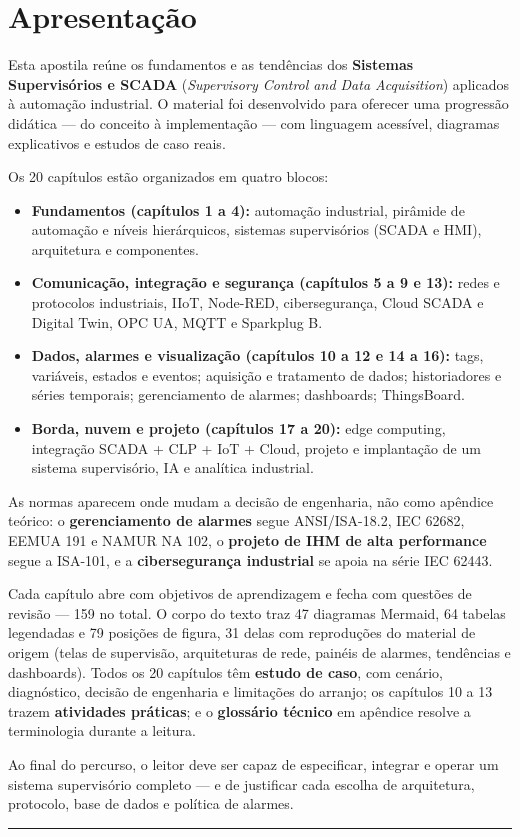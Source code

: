 \chapter*{Apresentação}
Esta apostila reúne os fundamentos e as tendências dos \textbf{Sistemas Supervisórios e SCADA} (\emph{Supervisory Control and Data Acquisition}) aplicados à automação industrial. O material foi desenvolvido para oferecer uma progressão didática --- do conceito à implementação --- com linguagem acessível, diagramas explicativos e estudos de caso reais.

Os 20 capítulos estão organizados em quatro blocos:

\begin{itemize}
\tightlist
\item
  \textbf{Fundamentos (capítulos 1 a 4):} automação industrial, pirâmide de automação e níveis hierárquicos, sistemas supervisórios (SCADA e HMI), arquitetura e componentes.
\item
  \textbf{Comunicação, integração e segurança (capítulos 5 a 9 e 13):} redes e protocolos industriais, IIoT, Node-RED, cibersegurança, Cloud SCADA e Digital Twin, OPC UA, MQTT e Sparkplug B.
\item
  \textbf{Dados, alarmes e visualização (capítulos 10 a 12 e 14 a 16):} tags, variáveis, estados e eventos; aquisição e tratamento de dados; historiadores e séries temporais; gerenciamento de alarmes; dashboards; ThingsBoard.
\item
  \textbf{Borda, nuvem e projeto (capítulos 17 a 20):} edge computing, integração SCADA + CLP + IoT + Cloud, projeto e implantação de um sistema supervisório, IA e analítica industrial.
\end{itemize}

As normas aparecem onde mudam a decisão de engenharia, não como apêndice teórico: o \textbf{gerenciamento de alarmes} segue ANSI/ISA-18.2, IEC 62682, EEMUA 191 e NAMUR NA 102, o \textbf{projeto de IHM de alta performance} segue a ISA-101, e a \textbf{cibersegurança industrial} se apoia na série IEC 62443.

Cada capítulo abre com objetivos de aprendizagem e fecha com questões de revisão --- 159 no total. O corpo do texto traz 47 diagramas Mermaid, 64 tabelas legendadas e 79 posições de figura, 31 delas com reproduções do material de origem (telas de supervisão, arquiteturas de rede, painéis de alarmes, tendências e dashboards). Todos os 20 capítulos têm \textbf{estudo de caso}, com cenário, diagnóstico, decisão de engenharia e limitações do arranjo; os capítulos 10 a 13 trazem \textbf{atividades práticas}; e o \textbf{glossário técnico} em apêndice resolve a terminologia durante a leitura.

Ao final do percurso, o leitor deve ser capaz de especificar, integrar e operar um sistema supervisório completo --- e de justificar cada escolha de arquitetura, protocolo, base de dados e política de alarmes.

\begin{center}\rule{0.5\linewidth}{0.5pt}\end{center}
